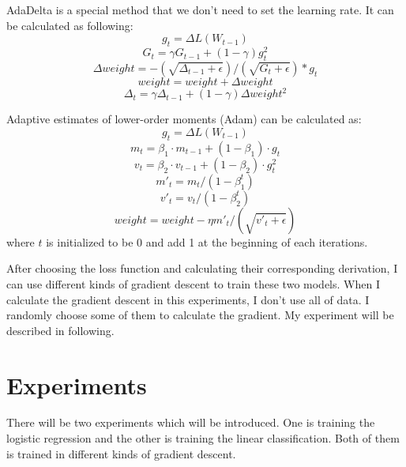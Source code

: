 \documentclass[journal, a4paper]{IEEEtran}
\begin{document}
AdaDelta is a special method that we don't need to set the learning rate. It can be calculated as following:
\begin{equation}
g_t=\Delta L(W_{t-1}) \label{eq18}
\end{equation}
\begin{equation}
G_t = \gamma G_{t-1} + (1-\gamma)g_t^2 \label{eq19}
\end{equation}
\begin{equation}
\Delta weight = -(\sqrt{\Delta_{t-1} + \epsilon}) / (\sqrt{G_{t} + \epsilon}) * g_t \label{eq20}
\end{equation}
\begin{equation}
weight = weight + \Delta weight \label{eq21}
\end{equation}
\begin{equation}
\Delta_{t}=\gamma \Delta_{t-1} + (1-\gamma)\Delta weight^2 \label{eq22}
\end{equation}

Adaptive estimates of lower-order moments (Adam) can be calculated as:
\begin{equation}
g_t=\Delta L(W_{t-1}) \label{eq23}
\end{equation}
\begin{equation}
m_t=\beta_1 \cdot m_{t-1} + (1-\beta_1) \cdot g_t \label{eq24}
\end{equation}
\begin{equation}
v_t=\beta_2 \cdot v_{t-1} + (1-\beta_2) \cdot g_t^2 \label{eq25}
\end{equation}
\begin{equation}
m'_t=m_t/(1-\beta_1^t) \label{eq26}
\end{equation}
\begin{equation}
v'_t=v_t/(1-\beta_2^t) \label{eq27}
\end{equation}
\begin{equation}
weight = weight - \eta m'_t / (\sqrt{v'_t+\epsilon})
\end{equation}
where $t$ is initialized to be 0 and add 1 at the beginning of each iterations.

After choosing the loss function and calculating their corresponding derivation, I can use different kinds of gradient descent to train these two models. When I calculate the gradient descent in this experiments, I don't use all of data. I randomly choose some of them to calculate the gradient. My experiment will be described in following.

\section{Experiments}
There will be two experiments which will be introduced. One is training the logistic regression and the other is training the linear classification. Both of them is trained in different kinds of gradient descent.
\end{document}
